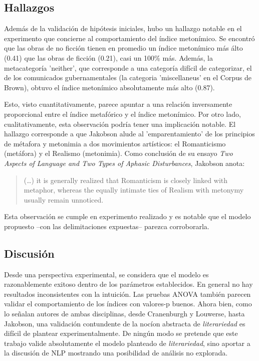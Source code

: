 \documentclass[12pt,letterpaper,twoside]{article}
\begin{document}
\subsection{Hallazgos}
\label{sec:org72c1b97}

Además de la validación de hipótesis iniciales, hubo un hallazgo
notable en el experimento que concierne al comportamiento del
índice metonímico. Se encontró que las obras de no ficción tienen
en promedio un índice metonímico más álto (0.41) que las obras de
ficción (0.21), casi un 100\% más. Además, la metacategoría
'neither', que corresponde a una categoría difícil de categorizar,
el de los comunicados gubernamentales (la categoria 'miscellaneus'
en el Corpus de Brown), obtuvo el índice metonímico absolutamente
más alto (0.87).

Esto, visto cuantitativamente, parece apuntar a una relación
inversamente proporcional entre el índice metafórico y el índice
metonímico. Por otro lado, cualitativamente, esta observación
podría tener una implicación notable.  El hallazgo corresponde a
que Jakobson alude al 'emparentamiento' de los principios de
métafora y metonimia a dos movimientos artísticos: el Romanticismo
(metáfora) y el Realismo (metonimia). Como conclusión de su ensayo
\emph{Two Aspects of Language and Two Types of Aphasic Disturbances},
Jakobson anota:

\begin{quote}
(\ldots{})  it is generally realized that Romanticism is closely linked
with metaphor, whereas the equally intimate ties of Realism with
metonymy usually remain unnoticed. \cite[114]{jakobson1956two}
\end{quote}

Esta observación se cumple en experimento realizado y es notable
que el modelo propuesto --con las delimitaciones expuestas--
parezca corroborarla.


\subsection{Discusión}
\label{sec:org332fb00}


Desde una perspectiva experimental, se considera que el modelo es
razonablemente exitoso dentro de los parámetros establecidos. En
general no hay resultados inconsistentes con la intuición. Las pruebas
ANOVA también parecen validar el comportamiento de los índices con
valores-p buenos. Ahora bien, como lo señalan autores de ambas
disciplinas, desde Cranenburgh y Louwerse, hasta Jakobson, una
validación contundente de la nocíon abstracta de \emph{literariedad} es
difícil de plantear experimentalmente. De ningún modo se pretende que
este trabajo valide absolutamente el modelo planteado de
\emph{literariedad}, sino aportar a la discusión de NLP mostrando una
posibilidad de análisis no explorada.
\end{document}
